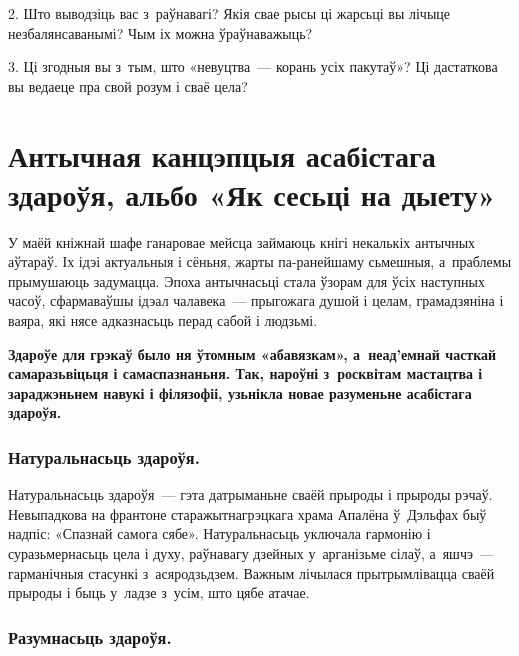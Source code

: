 2. Што выводзіць вас з~раўнавагі? Якія свае рысы ці жарсьці вы лічыце незбалянсаванымі? Чым іх можна ўраўнаважыць?

3. Ці згодныя вы з~тым, што «невуцтва~--- корань усіх пакутаў»? Ці дастаткова вы ведаеце пра свой розум і сваё цела?


\section[Антычная канцэпцыя асабістага здароўя, альбо «Як сесьці на дыету»][Антычная канцэпцыя асабістага здароўя]{Антычная канцэпцыя асабістага здароўя, альбо «Як сесьці на дыету»}


У маёй кніжнай шафе ганаровае мейсца займаюць кнігі некалькіх антычных аўтараў. Іх ідэі актуальныя і сёньня, жарты па-ранейшаму сьмешныя, а~праблемы прымушаюць задумацца. Эпоха антычнасьці стала ўзорам для ўсіх наступных часоў, сфармаваўшы ідэал чалавека~--- прыгожага душой і целам, грамадзяніна і ваяра, які нясе адказнасьць перад сабой і людзьмі. 

\textbf{Здароўе для грэкаў было ня ўтомным «абавязкам», а~неад'емнай часткай самаразьвіцьця і самаспазнаньня. Так, нароўні з~росквітам мастацтва і зараджэньнем навукі і філязофіі, узьнікла новае разуменьне асабістага здароўя.}

\subsubsection{Натуральнасьць здароўя.} 

Натуральнасьць здароўя~--- гэта датрыманьне сваёй прыроды і прыроды рэчаў. Невыпадкова на франтоне старажытнагрэцкага храма Апалёна ў~Дэльфах быў надпіс: «Спазнай самога сябе». Натуральнасьць уключала гармонію і суразьмернасьць цела і духу, раўнавагу дзейных у~арганізьме сілаў, а~яшчэ~--- гарманічныя стасункі з~асяродзьдзем. Важным лічылася прытрымлівацца сваёй прыроды і быць у~ладзе з~усім, што цябе атачае.


\subsubsection{Разумнасьць здароўя.} 

